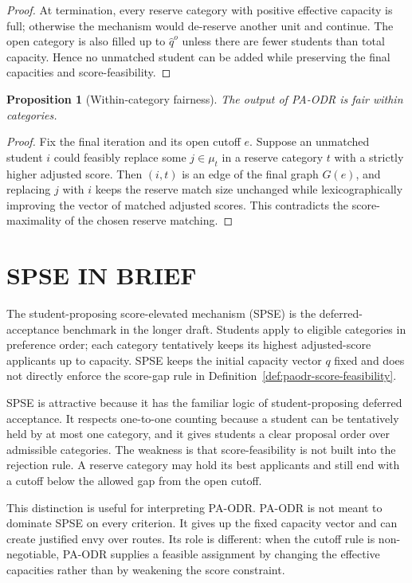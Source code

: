 \documentclass[a4paper,twoside]{article}
\newtheorem{proposition}{Proposition}
\begin{document}
\begin{proof}
At termination, every reserve category with positive effective capacity is full; otherwise the mechanism would de-reserve another unit and continue. The open category is also filled up to $\hat q^o$ unless there are fewer students than total capacity. Hence no unmatched student can be added while preserving the final capacities and score-feasibility.
\end{proof}

\begin{proposition}[Within-category fairness]
\label{prop:paodr-within-short}
The output of PA-ODR is fair within categories.
\end{proposition}

\begin{proof}
Fix the final iteration and its open cutoff $e$. Suppose an unmatched student $i$ could feasibly replace some $j\in\mu_t$ in a reserve category $t$ with a strictly higher adjusted score. Then $(i,t)$ is an edge of the final graph $G(e)$, and replacing $j$ with $i$ keeps the reserve match size unchanged while lexicographically improving the vector of matched adjusted scores. This contradicts the score-maximality of the chosen reserve matching.
\end{proof}

\section{\uppercase{SPSE in Brief}}

The student-proposing score-elevated mechanism (SPSE) is the deferred-acceptance benchmark in the longer draft. Students apply to eligible categories in preference order; each category tentatively keeps its highest adjusted-score applicants up to capacity. SPSE keeps the initial capacity vector $q$ fixed and does not directly enforce the score-gap rule in Definition~\ref{def:paodr-score-feasibility}.

SPSE is attractive because it has the familiar logic of student-proposing deferred acceptance. It respects one-to-one counting because a student can be tentatively held by at most one category, and it gives students a clear proposal order over admissible categories. The weakness is that score-feasibility is not built into the rejection rule. A reserve category may hold its best applicants and still end with a cutoff below the allowed gap from the open cutoff.

This distinction is useful for interpreting PA-ODR. PA-ODR is not meant to dominate SPSE on every criterion. It gives up the fixed capacity vector and can create justified envy over routes. Its role is different: when the cutoff rule is non-negotiable, PA-ODR supplies a feasible assignment by changing the effective capacities rather than by weakening the score constraint.
\end{document}
